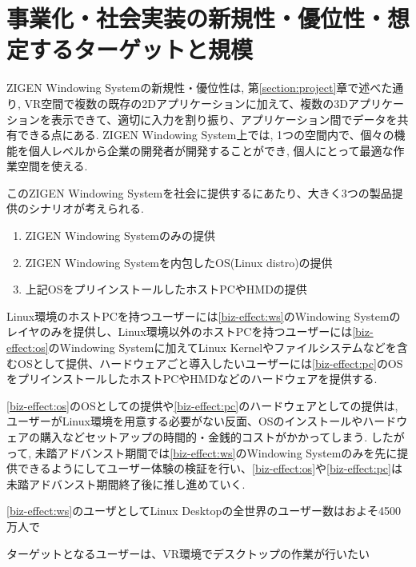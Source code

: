 \section{事業化・社会実装の新規性・優位性・想定するターゲットと規模}


ZIGEN Windowing Systemの新規性・優位性は, 第\ref{section:project}章で述べた通り, VR空間で複数の既存の2Dアプリケーションに加えて、複数の3Dアプリケーションを表示できて、適切に入力を割り振り、アプリケーション間でデータを共有できる点にある.
ZIGEN Windowing System上では, 1つの空間内で、個々の機能を個人レベルから企業の開発者が開発することができ, 個人にとって最適な作業空間を使える.

このZIGEN Windowing Systemを社会に提供するにあたり、大きく3つの製品提供のシナリオが考えられる.
\begin{enumerate}[label=(\alph*)]
  \item \label{biz-effect:ws} ZIGEN Windowing Systemのみの提供
  \item \label{biz-effect:os} ZIGEN Windowing Systemを内包したOS(Linux distro)の提供
  \item \label{biz-effect:pc} 上記OSをプリインストールしたホストPCやHMDの提供
\end{enumerate}

Linux環境のホストPCを持つユーザーには\ref{biz-effect:ws}のWindowing Systemのレイヤのみを提供し、Linux環境以外のホストPCを持つユーザーには\ref{biz-effect:os}のWindowing Systemに加えてLinux Kernelやファイルシステムなどを含むOSとして提供、ハードウェアごと導入したいユーザーには\ref{biz-effect:pc}のOSをプリインストールしたホストPCやHMDなどのハードウェアを提供する.

\ref{biz-effect:os}のOSとしての提供や\ref{biz-effect:pc}のハードウェアとしての提供は, ユーザーがLinux環境を用意する必要がない反面、OSのインストールやハードウェアの購入などセットアップの時間的・金銭的コストがかかってしまう.
したがって, 未踏アドバンスト期間では\ref{biz-effect:ws}のWindowing Systemのみを先に提供できるようにしてユーザー体験の検証を行い、\ref{biz-effect:os}や\ref{biz-effect:pc}は未踏アドバンスト期間終了後に推し進めていく.

\ref{biz-effect:ws}のユーザとしてLinux Desktopの全世界のユーザー数はおよそ4500万人で

ターゲットとなるユーザーは、VR環境でデスクトップの作業が行いたい
